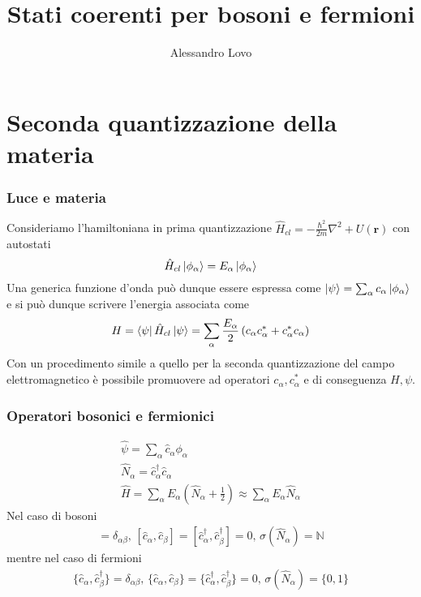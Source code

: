 \documentclass{beamer}
\title[Stati coerenti di materia]{Stati coerenti per bosoni e fermioni}
\author{Alessandro Lovo}
\begin{document}
\begin{frame}
  \maketitle
\end{frame}

\section{Seconda quantizzazione della materia}
\begin{frame}
  \frametitle{Luce e materia}
  Consideriamo l'hamiltoniana in prima quantizzazione $\hat{H}_{cl} = -\frac{\hbar^2}{2m}\nabla^2 + U(\mathbf{r})$ con autostati
  \begin{equation*}
    \hat{H}_{cl} \ket{\phi_{\alpha}} = E_{\alpha} \ket{\phi_{\alpha}}
  \end{equation*}
  Una generica funzione d'onda può dunque essere espressa come $\ket{\psi} = \sum_{\alpha} c_{\alpha} \ket{\phi_{\alpha}}$ e si può dunque scrivere l'energia associata come
  \begin{equation*}
    H = \bra{\psi} \hat{H}_{cl} \ket{\psi} = \sum_{\alpha} \frac{E_{\alpha}}{2} \left(c_{\alpha}c_{\alpha}^* + c_{\alpha}^*c_{\alpha} \right)
  \end{equation*}
  Con un procedimento simile a quello per la seconda quantizzazione del campo elettromagnetico è possibile promuovere ad operatori $c_{\alpha}, c_\alpha^*$ e di conseguenza $H, \psi$.

\end{frame}

\begin{frame}
  \frametitle{Operatori bosonici e fermionici}
  \begin{gather*}
    \hat{\psi} = \sum_{\alpha} \hat{c}_{\alpha} \phi_{\alpha}\\
    \hat{N}_{\alpha} = \hat{c}_{\alpha}^\dagger \hat{c}_\alpha \\
    \hat{H} = \sum_{\alpha} E_{\alpha} \left( \hat{N}_{\alpha} + \frac{1}{2} \right) \approx \sum_{\alpha} E_{\alpha} \hat{N}_{\alpha}
  \end{gather*}
  Nel caso di bosoni
  \begin{gather*}
    [\hat{c}_{\alpha},\hat{c}_{\beta}^\dagger] = \delta_{\alpha\beta}, \,
    [\hat{c}_{\alpha},\hat{c}_{\beta}] = [\hat{c}_{\alpha}^\dagger,\hat{c}_{\beta}^\dagger] = 0, \,
    \sigma(\hat{N}_\alpha) = \mathbb{N}
  \end{gather*}
  mentre nel caso di fermioni
  \begin{gather*}
    \{\hat{c}_{\alpha},\hat{c}_{\beta}^\dagger\} = \delta_{\alpha\beta}, \,
    \{\hat{c}_{\alpha},\hat{c}_{\beta}\} = \{\hat{c}_{\alpha}^\dagger,\hat{c}_{\beta}^\dagger\} = 0, \,
    \sigma(\hat{N}_\alpha) = \{0,1\}
  \end{gather*}
\end{frame}
\end{document}
